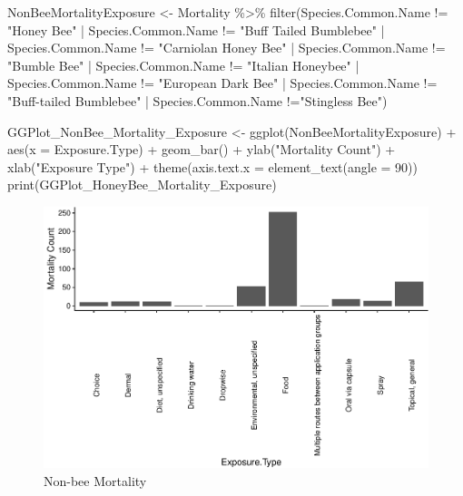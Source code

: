 \documentclass[
  12pt,
]{article}
\newenvironment{Shaded}{\begin{snugshade}}{\end{snugshade}}
\newcommand{\AttributeTok}[1]{\textcolor[rgb]{0.77,0.63,0.00}{#1}}
\newcommand{\DecValTok}[1]{\textcolor[rgb]{0.00,0.00,0.81}{#1}}
\newcommand{\FunctionTok}[1]{\textcolor[rgb]{0.00,0.00,0.00}{#1}}
\newcommand{\NormalTok}[1]{#1}
\newcommand{\OtherTok}[1]{\textcolor[rgb]{0.56,0.35,0.01}{#1}}
\newcommand{\SpecialCharTok}[1]{\textcolor[rgb]{0.00,0.00,0.00}{#1}}
\newcommand{\StringTok}[1]{\textcolor[rgb]{0.31,0.60,0.02}{#1}}
\begin{document}
\begin{Shaded}
\begin{Highlighting}[]
\NormalTok{ NonBeeMortalityExposure }\OtherTok{\textless{}{-}}\NormalTok{ Mortality }\SpecialCharTok{\%\textgreater{}\%}
  \FunctionTok{filter}\NormalTok{(Species.Common.Name }\SpecialCharTok{!=} \StringTok{"Honey Bee"} \SpecialCharTok{|}\NormalTok{ Species.Common.Name }\SpecialCharTok{!=} \StringTok{"Buff Tailed Bumblebee"} \SpecialCharTok{|}\NormalTok{ Species.Common.Name }\SpecialCharTok{!=} \StringTok{"Carniolan Honey Bee"} \SpecialCharTok{|}\NormalTok{ Species.Common.Name }\SpecialCharTok{!=} \StringTok{"Bumble Bee"} \SpecialCharTok{|}\NormalTok{ Species.Common.Name }\SpecialCharTok{!=} \StringTok{"Italian Honeybee"} \SpecialCharTok{|}\NormalTok{ Species.Common.Name }\SpecialCharTok{!=} \StringTok{"European Dark Bee"} \SpecialCharTok{|}\NormalTok{ Species.Common.Name }\SpecialCharTok{!=} \StringTok{"Buff{-}tailed Bumblebee"} \SpecialCharTok{|}\NormalTok{ Species.Common.Name }\SpecialCharTok{!=}\StringTok{"Stingless Bee"}\NormalTok{)}
 
\NormalTok{ GGPlot\_NonBee\_Mortality\_Exposure }\OtherTok{\textless{}{-}} \FunctionTok{ggplot}\NormalTok{(NonBeeMortalityExposure) }\SpecialCharTok{+}
   \FunctionTok{aes}\NormalTok{(}\AttributeTok{x =}\NormalTok{ Exposure.Type) }\SpecialCharTok{+}
   \FunctionTok{geom\_bar}\NormalTok{() }\SpecialCharTok{+}
   \FunctionTok{ylab}\NormalTok{(}\StringTok{"Mortality Count"}\NormalTok{) }\SpecialCharTok{+}
   \FunctionTok{xlab}\NormalTok{(}\StringTok{"Exposure Type"}\NormalTok{) }\SpecialCharTok{+}
   \FunctionTok{theme}\NormalTok{(}\AttributeTok{axis.text.x =} \FunctionTok{element\_text}\NormalTok{(}\AttributeTok{angle =} \DecValTok{90}\NormalTok{))}
 \FunctionTok{print}\NormalTok{(GGPlot\_HoneyBee\_Mortality\_Exposure)}
\end{Highlighting}
\end{Shaded}

\begin{figure}
\centering
\includegraphics{Project_Template_files/figure-latex/unnamed-chunk-4-1.pdf}
\caption{Non-bee Mortality}
\end{figure}
\end{document}
